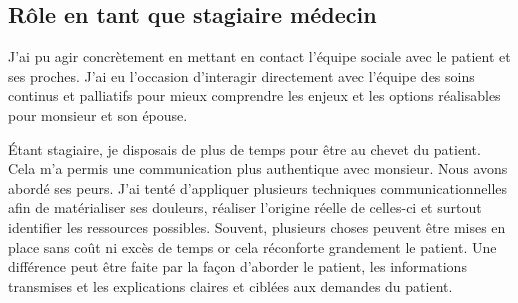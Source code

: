 \subsection{Rôle en tant que stagiaire médecin} 

J’ai pu agir concrètement en mettant en contact l’équipe sociale avec le patient et ses proches. J’ai eu l’occasion d’interagir directement avec l’équipe des soins continus et palliatifs pour mieux comprendre les enjeux et les options réalisables pour monsieur et son épouse.

Étant stagiaire, je disposais de plus de temps pour être au chevet du patient. Cela m’a permis une communication plus authentique avec monsieur. Nous avons abordé ses peurs. J’ai tenté d’appliquer plusieurs techniques communicationnelles afin de matérialiser ses douleurs, réaliser l’origine réelle de celles-ci et surtout identifier les ressources possibles. Souvent, plusieurs choses peuvent être mises en place sans coût ni excès de temps or cela réconforte grandement le patient. Une différence peut être faite par la façon d’aborder le patient, les informations transmises et les explications claires et ciblées aux demandes du patient.  

 
